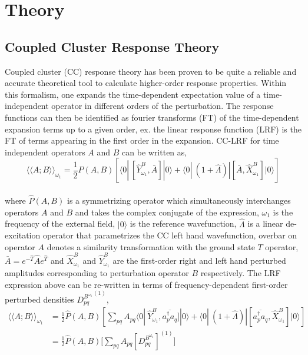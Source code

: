 \section{Theory}
\subsection{Coupled Cluster Response Theory}
Coupled cluster (CC) response theory has been proven to be quite a reliable and accurate theoretical
tool to calculate higher-order response properties. Within this formalism,
one expands the time-dependent expectation value of a time-independent operator 
in different orders of the perturbation. The response functions can then be identified 
as fourier transforms (FT) of the time-dependent expansion terms up to a given order, ex. the
linear response function (LRF) is the FT of terms appearing in the first order in the
expansion. CC-LRF for time independent operators $A$ and $B$ can be written as,
\\
\begin{equation}
{\langle\langle A;B\rangle\rangle}_{\omega_1} =  \frac{1}{2}\hat{P}(A,B)[\langle 0 | \
[\hat{Y}^{B}_{\omega_1}, \bar{A}]|0\rangle + \langle 0 | \
(1 + \hat{\Lambda})|[\bar{A},\hat{X}^{B}_{\omega_1}]|0\rangle]
\end{equation}
\\
where $\hat{P}(A,B)$ is a symmetrizing operator which simultaneously interchanges 
operators $A$ and $B$ and takes the complex conjugate of the expression, $\omega_1$ 
is the frequency of the external field, $|0\rangle$ is the reference wavefunction, $\hat{\Lambda}$ is
a linear de-excitation operator that parametrizes the CC left hand wavefunction, 
overbar on operator $A$ denotes a similarity transformation with the ground state 
$T$ operator, $\bar{A} = e^{-\hat{T}}\hat{A}e^{\hat{T}}$ and $\hat{X}^{B}_{\omega_1}$ 
and $\hat{Y}^{B}_{\omega_1}$ are the first-order right and left hand perturbed 
amplitudes corresponding to perturbation operator $B$ respectively.
The LRF expression above can be re-written in terms of frequency-dependent first-order 
perturbed densities ${D^{B^{\omega_1}}_{pq}}^{(1)}$, 
\\
\begin{equation}
\begin{split}
{\langle\langle A;B\rangle\rangle}_{\omega_1} & =  \frac{1}{2}\hat{P}(A,B)[\sum_{pq}A_{pq}\langle 0 | \
\hat{Y}^{B}_{\omega_1}, \overbar{a^{\dagger}_{p}a_q}]|0\rangle + \langle 0 | \
(1 + \hat{\Lambda})|[\overbar{a^{\dagger}_{p}a_q},\hat{X}^{B}_{\omega_1}]|0\rangle] \\
& = \frac{1}{2}\hat{P}(A,B) \big[\sum_{pq} A_{pq}[{D^{B^{\omega_1}}_{pq}}]^{(1)}\big]
\end{split}
\end{equation}
